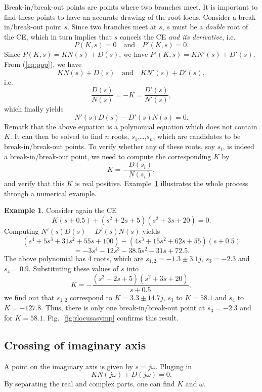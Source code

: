 \documentclass[a4paper,11pt]{report}
\theoremstyle{definition}
\newtheorem{mdexample}{Example}
\newenvironment{example}%
  {\vspace{0.1cm}\begin{mdframed}[backgroundcolor=lightgray]\begin{mdexample}}%
  {\end{mdexample}\end{mdframed}\vspace{0.1cm}}
\begin{document}
Break-in/break-out points are points where two branches meet. It is
important to find these points to have an accurate drawing of the root
locus. Consider a break-in/break-out point $s$. Since two branches
meet at $s$, $s$ must be a \emph{double} root of the CE, which in turn
implies that $s$ cancels the CE \emph{and its derivative}, i.e.
\begin{equation}
  \label{eq:ppp}
  P(K,s) = 0\quad \textrm{and} \quad P'(K,s)=0.
\end{equation}
Since $P(K,s)=KN(s)+D(s)$, we have $P'(K,s)=KN'(s)+D'(s)$. From
(\ref{eq:ppp}), we have
\[
KN(s)+D(s)  \quad \textrm{and} \quad  KN'(s)+D'(s),
\]
i.e.
\[
\frac{D(s)}{N(s)} = -K = \frac{D'(s)}{N'(s)},
\]
which finally yields
\[
N'(s)D(s)-D'(s)N(s) = 0.
\]
Remark that the above equation is a polynomial equation which does not
contain $K$. It can then be solved to find $n$ roots,
$s_1$,\dots,$s_n$, which are candidates to be break-in/break-out
points. To verify whether any of these roots, say $s_i$, is indeed a
break-in/break-out point, we need to compute the corresponding $K$ by
\[
K = -\frac{D(s_i)}{N(s_i)},
\]
and verify that this $K$ is real positive. Example~\ref{ex:break}
illustrates the whole process through a numerical example.

\begin{example}
  \label{ex:break}
  Consider again the CE
  \[
  K(s+0.5) + (s^2+2s+5)(s^2+3s+20) = 0.
  \]
  Computing $N'(s)D(s)-D'(s)N(s)$ yields
  \[
  (s^4+5s^3+31s^2+55s+100)-(4s^3+15s^2+62s+55)(s+0.5)
  \]
  \[
  = -3s^4-12s^3-38.5s^2-31s+72.5.  
  \]
  The above polynomial has 4 roots, which are $s_{1,2}=-1.3\pm3.1j$,
  $s_3=-2.3$ and $s_4=0.9$. Substituting these values of $s$ into
  \[
  K = -\frac{(s^2+2s+5)(s^2+3s+20)}{s+0.5},
  \]
  we find out that $s_{1,2}$ correspond to $K=3.3\pm14.7j$, $s_3$
  to $K=58.1$ and $s_4$ to $K=-127.8$. Thus, there is only one
  break-in/break-out point at $s_3=-2.3$ and for
  $K=58.1$. Fig.~\ref{fig:rlocusasymp} confirms this result.
\end{example}



\subsection{Crossing of imaginary axis}

A point on the imaginary axis is given by $s=j\omega$. Pluging in
\[
KN(j\omega) + D(j\omega)=0.
\]
By separating the real and complex parts, one can find $K$ and
$\omega$.
\end{document}
